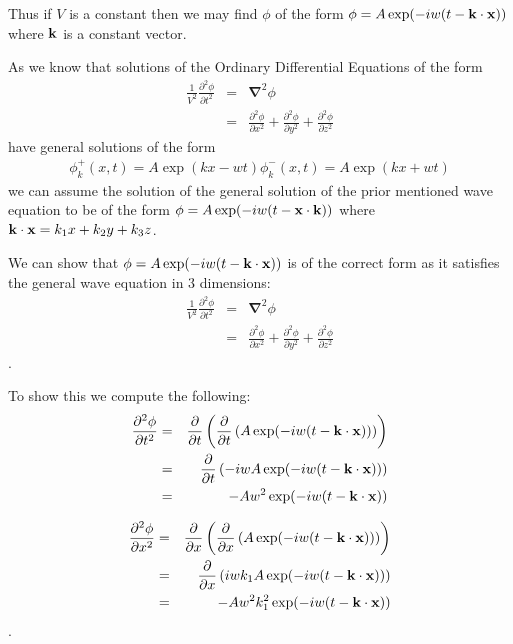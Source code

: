 \documentclass{mm2}
\newcommand{\bnabla}{\boldsymbol{\nabla}}
\begin{document}
\begin{answer}{1}
Thus if $V$ is a constant then we may find $\phi$ of the form $\phi = A \exp(-iw(t - {\bf k} \cdot {\bf x}))$ where ${\bf k}$  is a constant vector.

As we know that solutions of the Ordinary Differential Equations of the form 
\begin{eqnarray}
\frac{1}{V^2}\frac{\partial^2 \phi}{\partial t^2}&=&\bnabla^2\phi\nonumber\\
&=&\frac{\partial^2 \phi}{\partial x^2}+\frac{\partial^2 \phi}{\partial y^2}+
\frac{\partial^2 \phi}{\partial z^2}
\label{eq_wave}
\end{eqnarray}
have general solutions of the form 
\begin{eqnarray}
\phi^+_k(x,t) = A\exp(kx -wt)
\phi^-_k(x,t) = A\exp(kx +wt)
\end{eqnarray}
we can assume the solution of the general solution of the prior mentioned wave equation to be of the form $\phi = A \exp(-iw(t - {\bf x} \cdot {\bf k} ))$ where ${\bf k}\cdot {\bf x} = k_1x + k_2y + k_3z$.

We can show that $\phi = A \exp(-iw(t - {\bf k}\cdot {\bf x}))$ is of the correct form as it satisfies the general wave equation in 3 dimensions: \begin{eqnarray}
\frac{1}{V^2}\frac{\partial^2 \phi}{\partial t^2}&=&\bnabla^2\phi\nonumber\\
&=&\frac{\partial^2 \phi}{\partial x^2}+\frac{\partial^2 \phi}{\partial y^2}+
\frac{\partial^2 \phi}{\partial z^2}
\label{eq_wave}
\end{eqnarray}.


To show this we compute the following:
\begin{eqnarray}
\frac{\partial^2\phi}{\partial t^2}&=&\frac{\partial}{\partial t} \left(  \frac{\partial}{\partial t}  \left(  A\exp(-iw(t - {\bf k}\cdot {\bf x} ))  \right) \right)\\ &=&  \frac{\partial}{\partial t} \left( -iwA \exp(-iw(t - {\bf k}\cdot {\bf x} ))\right)\\ &=& -Aw^2 \exp(-iw(t - {\bf k}\cdot {\bf x} ))\\
\end{eqnarray}

\begin{eqnarray}
\frac{\partial^2\phi}{\partial x^2}&=&\frac{\partial}{\partial x} \left(  \frac{\partial}{\partial x}  \left(  A\exp(-iw(t - {\bf k}\cdot {\bf x}))  \right) \right)\\ &=&  \frac{\partial}{\partial x} \left( iwk_1A \exp(-iw(t - {\bf k}\cdot {\bf x} ))\right)\\ &=& -Aw^2k_1^2 \exp(-iw(t - {\bf k}\cdot {\bf x} ))\\
\end{eqnarray}.


\end{answer}
\end{document}
